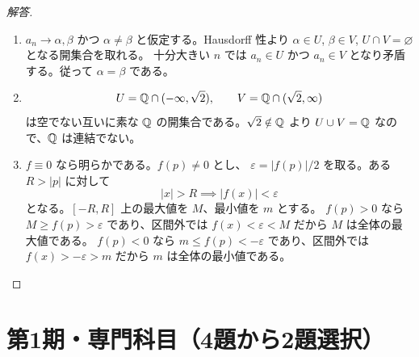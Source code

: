 \begin{proof}[解答]
\begin{enumerate}
  \item[(1)] $a_n\to\alpha,\beta$ かつ $\alpha\ne\beta$ と仮定する。Hausdorff 性より
  $\alpha\in U$, $\beta\in V$, $U\cap V=\varnothing$ となる開集合を取れる。
  十分大きい $n$ では $a_n\in U$ かつ $a_n\in V$ となり矛盾する。従って $\alpha=\beta$ である。

  \item[(2)]
  \[
  U=\mathbb{Q}\cap(-\infty,\sqrt2),\qquad
  V=\mathbb{Q}\cap(\sqrt2,\infty)
  \]
  は空でない互いに素な $\mathbb{Q}$ の開集合である。$\sqrt2\notin\mathbb{Q}$ より
  $U\cup V=\mathbb{Q}$ なので、$\mathbb{Q}$ は連結でない。

  \item[(3)] $f\equiv0$ なら明らかである。$f(p)\ne0$ とし、
  $\varepsilon=|f(p)|/2$ を取る。ある $R>|p|$ に対して
  \[
  |x|>R\implies |f(x)|<\varepsilon
  \]
  となる。$[-R,R]$ 上の最大値を $M$、最小値を $m$ とする。
  $f(p)>0$ なら $M\ge f(p)>\varepsilon$ であり、区間外では
  $f(x)<\varepsilon<M$ だから $M$ は全体の最大値である。
  $f(p)<0$ なら $m\le f(p)<-\varepsilon$ であり、区間外では
  $f(x)>-\varepsilon>m$ だから $m$ は全体の最小値である。
\end{enumerate}
\end{proof}

\section{第1期・専門科目（4題から2題選択）}

